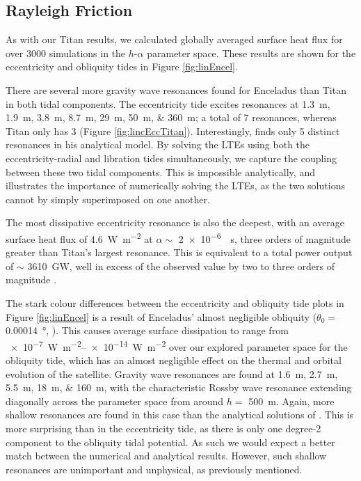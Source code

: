 \subsection{Rayleigh Friction}

As with our Titan results, we calculated globally averaged surface heat flux for over 3000 simulations in the $h$-$\alpha$ parameter space. These results are shown for the eccentricity and obliquity tides in Figure \ref{fig:linEncel}.

There are several more gravity wave resonances found for Enceladus than Titan in both tidal components. The eccentricity tide excites resonances at \SIlist{1.3;1.9;3.8;8.7;29;50;360}{m}; a total of 7 resonances, whereas Titan only has 3 (Figure \ref{fig:lincEccTitan}). Interestingly,  \citet{matsuyama2014tidal} finds only 5 distinct resonances in his analytical model. By solving the LTEs using both the eccentricity-radial and libration tides simultaneously, we capture the coupling between these two tidal components. This is impossible analytically, and illustrates the importance of numerically solving the LTEs, as the two solutions cannot by simply superimposed on one another.

The most dissipative eccentricity resonance is also the deepest, with an average surface heat flux of \SI{4.6}{\watt\per\square\metre} at $\alpha\sim$ \SI{2e-6}{\per\second}, three orders of magnitude greater than Titan's largest resonance. This is equivalent to a total power output of $\sim$ \SI{3610}{\giga\watt}, well in excess of the observed value by two to three orders of magnitude \citep{spencer2006cassini}. 

The stark colour differences between the eccentricity and obliquity tide plots in Figure \ref{fig:linEncel} is a result of Enceladus' almost negligible obliquity ($\theta_0 =$ \SI{0.00014}{\degree}, \citep{chen2013tidal}). This causes average surface dissipation to range from \SIrange{e-7}{e-14}{\watt\per\square\metre} over our explored parameter space for the obliquity tide, which has an almost negligible effect on the thermal and orbital evolution of the satellite. Gravity wave resonances are found at \SIlist{1.6;2.7;5.5;18;160}{\metre}, with the characteristic Rossby wave resonance extending diagonally across the parameter space from around $h=$ \SI{500}{\metre}. Again, more shallow resonances are found in this case than the analytical solutions of \citet{matsuyama2014tidal}. This is more surprising than in the eccentricity tide, as there is only one degree-2 component to the obliquity tidal potential. As such we would expect a better match between the numerical and analytical results. However, such shallow resonances are unimportant and unphysical, as previously mentioned.

